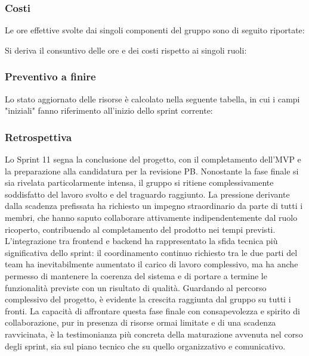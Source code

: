 \documentclass[10pt, letterpaper]{article}
\begin{document}
    \subsubsection{Costi}
    Le ore effettive svolte dai singoli componenti del gruppo sono di seguito riportate:

    \setRuoloFilippo{\Progr}
    \setRuoloChristian{\Resp}
    \setRuoloValeria{\Progr}
    \setRuoloGiuseppe{\Verif}
    \setRuoloFrancesco{\Progr}
    \setRuoloLuca{\Amm}
    \setRuoloLeonardo{\Progr}



    Si deriva il consuntivo delle ore e dei costi rispetto ai singoli ruoli:

    \subsubsection{Preventivo a finire}
    Lo stato aggiornato delle risorse è calcolato nella seguente tabella, in cui i campi "iniziali" fanno riferimento all'inizio dello sprint corrente:


    \subsubsection{Retrospettiva}
Lo Sprint 11 segna la conclusione del progetto, con il completamento dell'MVP e la preparazione alla candidatura per la revisione PB. Nonostante la fase finale si sia rivelata particolarmente intensa, il gruppo si ritiene complessivamente soddisfatto del lavoro svolto e del traguardo raggiunto.
La pressione derivante dalla scadenza prefissata ha richiesto un impegno straordinario da parte di tutti i membri, che hanno saputo collaborare attivamente indipendentemente dal ruolo ricoperto, contribuendo al completamento del prodotto nei tempi previsti. L'integrazione tra frontend e backend ha rappresentato la sfida tecnica più significativa dello sprint: il coordinamento continuo richiesto tra le due parti del team ha inevitabilmente aumentato il carico di lavoro complessivo, ma ha anche permesso di mantenere la coerenza del sistema e di portare a termine le funzionalità previste con un risultato di qualità.
Guardando al percorso complessivo del progetto, è evidente la crescita raggiunta dal gruppo su tutti i fronti. La capacità di affrontare questa fase finale con consapevolezza e spirito di collaborazione, pur in presenza di risorse ormai limitate e di una scadenza ravvicinata, è la testimonianza più concreta della maturazione avvenuta nel corso degli sprint, sia sul piano tecnico che su quello organizzativo e comunicativo.
\end{document}
